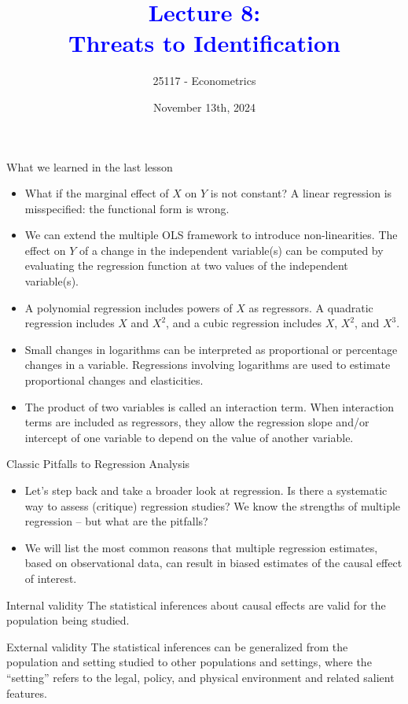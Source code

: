 \documentclass[notes,10pt, aspectratio=169]{beamer}
\title[]{\textcolor{blue}{Lecture 8:\\Threats to Identification}}
\author{25117 - Econometrics}
\institute[shortinst]{Universitat Pompeu Fabra}
\date{November 13th, 2024}
\begin{document}
\begin{frame}[plain]
\maketitle
\end{frame}



\begin{frame}{What we learned in the last lesson}
\begin{itemize}
    \item What if the marginal effect of $X$ on $Y$ is not constant? A linear regression is misspecified: the functional form is wrong.\\
    \item We can extend the multiple OLS framework to introduce non-linearities. The effect on $Y$ of a change in the independent variable(s) can be computed by evaluating the regression function at two values of the independent variable(s).\\
    \item A polynomial regression includes powers of $X$ as regressors. A quadratic regression includes $X$ and $X^2$, and a cubic regression includes $X$, $X^2$, and $X^3$.
    \item Small changes in logarithms can be interpreted as proportional or percentage changes in a variable. Regressions involving logarithms are used to estimate proportional changes and elasticities.
    \item The product of two variables is called an interaction term. When interaction terms are included as regressors, they allow the regression slope and/or intercept of one variable to depend on the value of another variable.
\end{itemize}
\end{frame}

\begin{frame}{Classic Pitfalls to Regression Analysis}
\begin{itemize}
    \item Let’s step back and take a broader look at regression. Is there a systematic way to assess (critique) regression studies? We know the strengths of multiple regression – but what are the pitfalls?\\[1em]
    \item We will list the most common reasons that multiple regression estimates, based on observational data, can result in biased estimates of the causal effect of interest.
\end{itemize}
\begin{exampleblock}{Internal validity}
The statistical inferences about causal effects are valid for the population being studied.
\end{exampleblock}
\begin{exampleblock}{External validity}
The statistical inferences can be generalized from the population and setting studied to other populations and settings, where the ``setting'' refers to the legal, policy, and physical environment and related salient features.
\end{exampleblock}

\end{frame}
\end{document}
